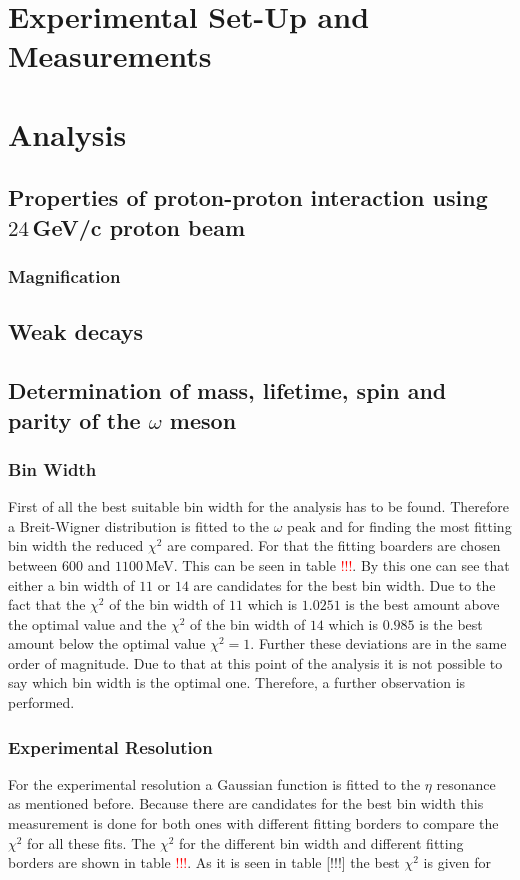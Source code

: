 \documentclass[10pt, a4paper, notitlepage, DIV=15]{scrartcl}
\begin{document}
\section{Experimental Set-Up and Measurements}

\section{Analysis}
\subsection{Properties of proton-proton interaction using $24\,$GeV/c proton beam}
\subsubsection{Magnification}
\subsection{Weak decays}
\subsection{Determination of mass, lifetime, spin and parity of the $\omega$ meson}
\subsubsection{Bin Width}
First of all the best suitable bin width for the analysis has to be found. Therefore a Breit-Wigner distribution is fitted to the $\omega$ peak and for finding the most fitting bin width the reduced $\chi^2$ are compared. For that the fitting boarders are chosen between $600$ and $1100\,$MeV. This can be seen in table \textcolor{red}{!!!}. By this one can see that either a bin width of $11$ or $14$ are candidates for the best bin width. Due to the fact that the $\chi^2$ of the bin width of $11$ which is $1.0251$ is the best amount above the optimal value and the $\chi^2$ of the bin width of $14$ which is $0.985$ is the best amount below the optimal value $\chi^2=1$. Further these deviations are in the same order of magnitude. Due to that at this point of the analysis it is not possible to say which bin width is the optimal one. Therefore, a further observation is performed.
\subsubsection{Experimental Resolution}
For the experimental resolution a Gaussian function is fitted to the $\eta$ resonance as mentioned before. Because there are candidates for the best bin width this measurement is done for both ones with different fitting borders to compare the $\chi^2$ for all these fits. The $\chi^2$ for the different bin width and different fitting borders are shown in table \textcolor{red}{!!!}. As it is seen in table [!!!] the best $\chi^2$ is given for 
\end{document}

